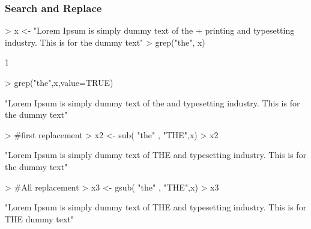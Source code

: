 \documentclass{beamer}
\begin{document}
\begin{frame}[fragile]\frametitle{Search and Replace}
\begin{Schunk}
\begin{Sinput}
> x <- "Lorem Ipsum is simply dummy text of the 
+ printing and typesetting industry. This is for the dummy text"
> grep("the", x)
\end{Sinput}
\begin{Soutput}
[1] 1
\end{Soutput}
\begin{Sinput}
> grep("the",x,value=TRUE)
\end{Sinput}
\begin{Soutput}
[1] "Lorem Ipsum is simply dummy text of the \nprinting and typesetting industry. This is for the dummy text"
\end{Soutput}
\begin{Sinput}
> #first replacement 
> x2 <- sub( "the" , "THE",x)
> x2
\end{Sinput}
\begin{Soutput}
[1] "Lorem Ipsum is simply dummy text of THE \nprinting and typesetting industry. This is for the dummy text"
\end{Soutput}
\begin{Sinput}
> #All replacement 
> x3 <- gsub( "the" , "THE",x)
> x3
\end{Sinput}
\begin{Soutput}
[1] "Lorem Ipsum is simply dummy text of THE \nprinting and typesetting industry. This is for THE dummy text"
\end{Soutput}
\end{Schunk}

\end{frame}
\end{document}
